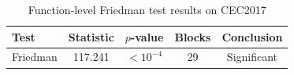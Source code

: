 \begin{table}[t]
\centering
\caption{Function-level Friedman test results on CEC2017}
\label{tab:cec2017_friedman}
\small
\begin{tabular}{lcccc}
\toprule
Test & Statistic & $p$-value & Blocks & Conclusion \\
\midrule
Friedman & 117.241 & $<10^{-4}$ & 29 & Significant \\
\bottomrule
\end{tabular}
\end{table}